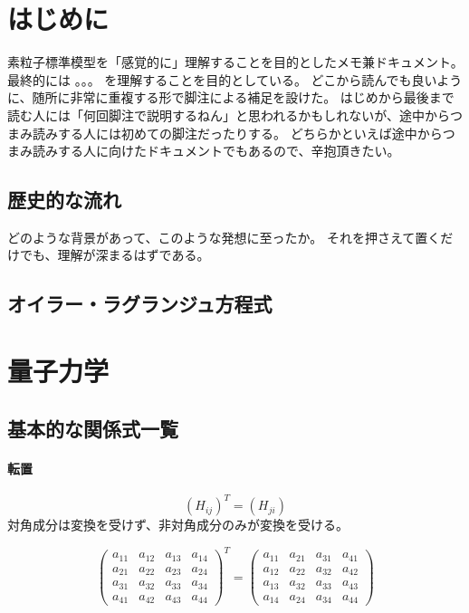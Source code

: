 \documentclass[a4paper,11pt,uplatex]{jsreport}
\begin{document}
\chapter{はじめに}
素粒子標準模型を「感覚的に」理解することを目的としたメモ兼ドキュメント。
最終的には
。。。
を理解することを目的としている。
どこから読んでも良いように、随所に非常に重複する形で脚注による補足を設けた。
はじめから最後まで読む人には「何回脚注で説明するねん」と思われるかもしれないが、途中からつまみ読みする人には初めての脚注だったりする。
どちらかといえば途中からつまみ読みする人に向けたドキュメントでもあるので、辛抱頂きたい。

\section{歴史的な流れ}
どのような背景があって、このような発想に至ったか。
それを押さえて置くだけでも、理解が深まるはずである。

\section{オイラー・ラグランジュ方程式}

\chapter{量子力学}
\section{基本的な関係式一覧}

\subsubsection{転置}
\begin{equation}
  (H_{ij})^{T}=(H_{ji})
\end{equation}
対角成分は変換を受けず、非対角成分のみが変換を受ける。

\begin{equation}
  \left(
    \begin{array}{cccc}
      a_{11} & a_{12} & a_{13} & a_{14} \\
      a_{21} & a_{22} & a_{23} & a_{24} \\
      a_{31} & a_{32} & a_{33} & a_{34} \\
      a_{41} & a_{42} & a_{43} & a_{44} 
    \end{array}
  \right)
    ^{T}
    =
  \left(
    \begin{array}{cccc}
      a_{11} & a_{21} & a_{31} & a_{41} \\
      a_{12} & a_{22} & a_{32} & a_{42} \\
      a_{13} & a_{32} & a_{33} & a_{43} \\
      a_{14} & a_{24} & a_{34} & a_{44} 
    \end{array}
  \right)
\end{equation}
\end{document}
